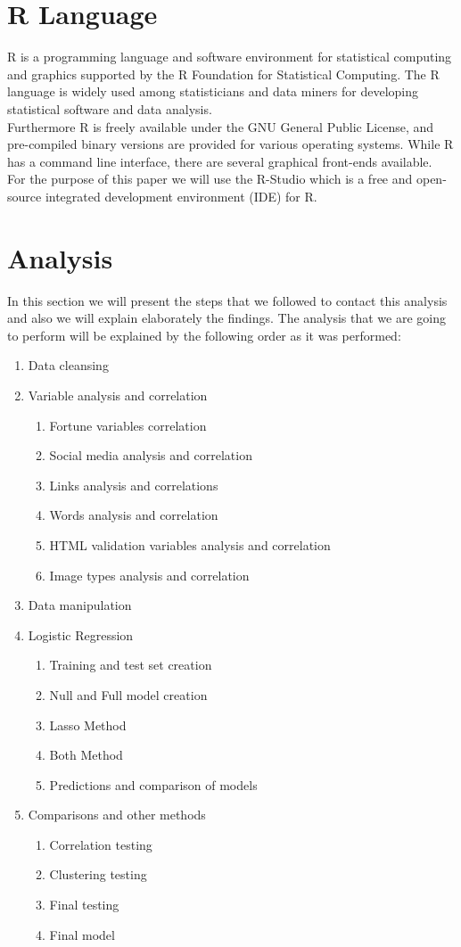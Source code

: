 \documentclass{book}
\begin{document}
\section{R Language}
R is a programming language and software environment for statistical computing and graphics supported by the R Foundation for Statistical Computing. The R language is widely used among statisticians and data miners for developing statistical software and data analysis.\\ 
Furthermore R is freely available under the GNU General Public License, and pre-compiled binary versions are provided for various operating systems. While R has a command line interface, there are several graphical front-ends available.\\
For the purpose of this paper we will use the R-Studio which  is a free and open-source integrated development environment (IDE) for R.
\section{Analysis}
In this section we will present the steps that we followed to contact this analysis and also we will explain elaborately the findings. The analysis that we are going to perform will be explained by the following order as it was performed:
\begin{enumerate}
\item Data cleansing
\item Variable analysis and correlation
\begin{enumerate}
\item Fortune variables correlation
\item Social media analysis and correlation
\item Links analysis and correlations
\item Words analysis and correlation
\item HTML validation variables analysis and correlation
\item Image types analysis and correlation
\end{enumerate}
\item Data manipulation
\item Logistic Regression
\begin{enumerate}
\item Training and test set creation
\item Null and Full model creation
\item Lasso Method
\item Both Method
\item Predictions and comparison of models
\end{enumerate}
\item Comparisons and other methods
\begin{enumerate}
\item Correlation testing
\item Clustering testing
\item Final testing
\item Final model
\end{enumerate}
\end{enumerate}
\end{document}

